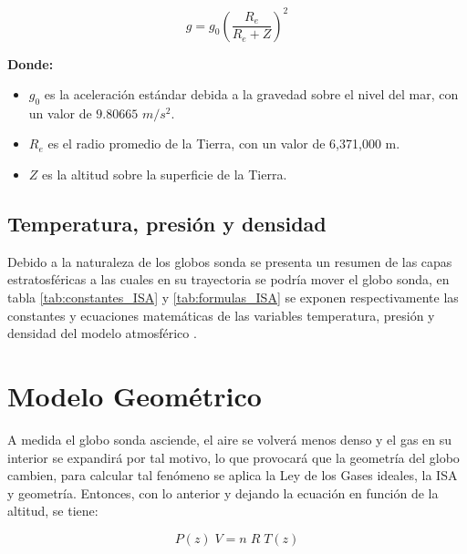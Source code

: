 \begin{equation}
    \label{eq:gravedad}
    g = g_0 \left(\frac{R_e}{R_e + Z}\right)^2
\end{equation}

\textbf{Donde:}
\begin{itemize}
    \item 	$g_{0}$ es la aceleración estándar debida a la gravedad sobre el nivel del mar, con un valor de $ 9.80665 $  $ m/s^{2} $.
    \item 	$R_e$ es el radio promedio de la Tierra, con un valor de 6,371,000 m.
    \item 	$Z$ es la altitud sobre la superficie de la Tierra.
\end{itemize}

\subsection{Temperatura, presión y densidad} \label{ssct:simulacion:ISA_variables}

Debido a la naturaleza de los globos sonda se presenta un resumen de las capas estratosféricas a las cuales en su trayectoria se podría mover el globo sonda, en tabla \ref{tab:constantes_ISA}  y  \ref{tab:formulas_ISA}  se exponen respectivamente las constantes y ecuaciones matemáticas de las variables temperatura, presión y densidad del modelo atmosférico \cite{tabla_isa}.




\newpage

\section{Modelo Geométrico} \label{sct:simulacion:modelo_geometrico}

A medida el globo sonda asciende, el aire se volverá menos denso y el gas en su interior se expandirá por tal motivo, lo que provocará que la geometría del globo cambien,  para calcular tal fenómeno se aplica la Ley de los Gases ideales, la ISA y geometría. Entonces,  con lo anterior y dejando la ecuación en función de la altitud, se tiene:


\begin{equation}
    \label{eq:geometria}
    P(z) \; V = n \; R \; T(z) 
\end{equation}


